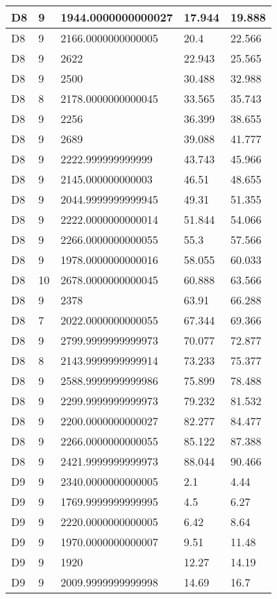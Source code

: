 \begin{longtable}{|l|l|l|l|l|}
D8 & 9 & 1944.0000000000027 & 17.944 & 19.888 \\ \hline
D8 & 9 & 2166.0000000000005 & 20.4 & 22.566 \\ \hline
D8 & 9 & 2622 & 22.943 & 25.565 \\ \hline
D8 & 9 & 2500 & 30.488 & 32.988 \\ \hline
D8 & 8 & 2178.0000000000045 & 33.565 & 35.743 \\ \hline
D8 & 9 & 2256 & 36.399 & 38.655 \\ \hline
D8 & 9 & 2689 & 39.088 & 41.777 \\ \hline
D8 & 9 & 2222.999999999999 & 43.743 & 45.966 \\ \hline
D8 & 9 & 2145.000000000003 & 46.51 & 48.655 \\ \hline
D8 & 9 & 2044.9999999999945 & 49.31 & 51.355 \\ \hline
D8 & 9 & 2222.0000000000014 & 51.844 & 54.066 \\ \hline
D8 & 9 & 2266.0000000000055 & 55.3 & 57.566 \\ \hline
D8 & 9 & 1978.0000000000016 & 58.055 & 60.033 \\ \hline
D8 & 10 & 2678.0000000000045 & 60.888 & 63.566 \\ \hline
D8 & 9 & 2378 & 63.91 & 66.288 \\ \hline
D8 & 7 & 2022.0000000000055 & 67.344 & 69.366 \\ \hline
D8 & 9 & 2799.9999999999973 & 70.077 & 72.877 \\ \hline
D8 & 8 & 2143.9999999999914 & 73.233 & 75.377 \\ \hline
D8 & 9 & 2588.9999999999986 & 75.899 & 78.488 \\ \hline
D8 & 9 & 2299.9999999999973 & 79.232 & 81.532 \\ \hline
D8 & 9 & 2200.0000000000027 & 82.277 & 84.477 \\ \hline
D8 & 9 & 2266.0000000000055 & 85.122 & 87.388 \\ \hline
D8 & 9 & 2421.9999999999973 & 88.044 & 90.466 \\ \hline
D9 & 9 & 2340.0000000000005 & 2.1 & 4.44 \\ \hline
D9 & 9 & 1769.9999999999995 & 4.5 & 6.27 \\ \hline
D9 & 9 & 2220.0000000000005 & 6.42 & 8.64 \\ \hline
D9 & 9 & 1970.0000000000007 & 9.51 & 11.48 \\ \hline
D9 & 9 & 1920 & 12.27 & 14.19 \\ \hline
D9 & 9 & 2009.9999999999998 & 14.69 & 16.7 \\ \hline

\end{longtable}
